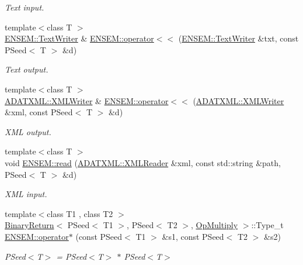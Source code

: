 \begin{DoxyCompactItemize}
\begin{DoxyCompactList}\small\item\em Text input. \end{DoxyCompactList}\item 
{\footnotesize template$<$class T $>$ }\\\mbox{\hyperlink{classENSEM_1_1TextWriter}{E\+N\+S\+E\+M\+::\+Text\+Writer}} \& \mbox{\hyperlink{group__primseed_ga297984102d54c010e9c54ca03f4f8151}{E\+N\+S\+E\+M\+::operator$<$$<$}} (\mbox{\hyperlink{classENSEM_1_1TextWriter}{E\+N\+S\+E\+M\+::\+Text\+Writer}} \&txt, const P\+Seed$<$ T $>$ \&d)
\begin{DoxyCompactList}\small\item\em Text output. \end{DoxyCompactList}\item 
{\footnotesize template$<$class T $>$ }\\\mbox{\hyperlink{classADATXML_1_1XMLWriter}{A\+D\+A\+T\+X\+M\+L\+::\+X\+M\+L\+Writer}} \& \mbox{\hyperlink{group__primseed_ga439f61b77175a57d5c91c25e0eda2733}{E\+N\+S\+E\+M\+::operator$<$$<$}} (\mbox{\hyperlink{classADATXML_1_1XMLWriter}{A\+D\+A\+T\+X\+M\+L\+::\+X\+M\+L\+Writer}} \&xml, const P\+Seed$<$ T $>$ \&d)
\begin{DoxyCompactList}\small\item\em X\+ML output. \end{DoxyCompactList}\item 
{\footnotesize template$<$class T $>$ }\\void \mbox{\hyperlink{group__primseed_ga419a0f6fba320ad373bae7c40e3d2330}{E\+N\+S\+E\+M\+::read}} (\mbox{\hyperlink{classADATXML_1_1XMLReader}{A\+D\+A\+T\+X\+M\+L\+::\+X\+M\+L\+Reader}} \&xml, const std\+::string \&path, P\+Seed$<$ T $>$ \&d)
\begin{DoxyCompactList}\small\item\em X\+ML input. \end{DoxyCompactList}\item 
{\footnotesize template$<$class T1 , class T2 $>$ }\\\mbox{\hyperlink{structBinaryReturn}{Binary\+Return}}$<$ P\+Seed$<$ T1 $>$, P\+Seed$<$ T2 $>$, \mbox{\hyperlink{structOpMultiply}{Op\+Multiply}} $>$\+::Type\+\_\+t \mbox{\hyperlink{group__primseed_ga519cf992fa84c24500a0128f1c684b8f}{E\+N\+S\+E\+M\+::operator$\ast$}} (const P\+Seed$<$ T1 $>$ \&s1, const P\+Seed$<$ T2 $>$ \&s2)
\begin{DoxyCompactList}\small\item\em P\+Seed$<$\+T$>$ = P\+Seed$<$\+T$>$ $\ast$ P\+Seed$<$\+T$>$ \end{DoxyCompactList}\item 

\end{DoxyCompactItemize}
